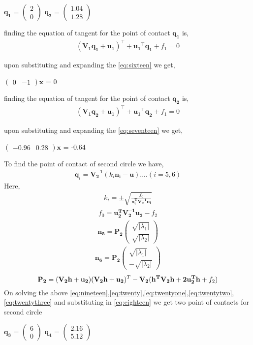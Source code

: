\documentclass[journal,12pt,twocolumn]{IEEEtran}
\newcommand{\myvec}[1]{\ensuremath{\begin{pmatrix}#1\end{pmatrix}}}
\let\vec\mathbf
\begin{document}
\begin{center}
$\vec{q_1}$ = $\myvec{2 \\ 0}$
$\vec{q_2}$ = $\myvec{1.04 \\ 1.28}$ 
\end{center}

finding the equation of tangent for the point of contact $\vec{q_1}$ is,
\begin{align}
\label{eq:sixteen}
(\vec{V_1}\vec{q_1}+\vec{u_1})^{\top}+\vec{u_1}^{\top}\vec{q_1} + f_1 = 0
\end{align} 

upon substituting and expanding the \eqref{eq:sixteen} we get,
\begin{center}
$\myvec{0 & -1}\vec{x}$ = 0 
\end{center}

finding the equation of tangent for the point of contact $\vec{q_2}$ is,
\begin{align}
\label{eq:seventeen}
(\vec{V_1}\vec{q_2}+\vec{u_1})^{\top}+\vec{u_1}^{\top}\vec{q_2} + f_1 = 0 
\end{align}

upon substituting and expanding the \eqref{eq:seventeen} we get,
\begin{center}
$\myvec{-0.96 & 0.28}\vec{x}$ = -0.64
\end{center}

To find the point of contact of second circle we have, 
\begin{align}
\label{eq:eighteen}
\boxed{\vec{q}_i = \vec{V_2^{-1}}(k_i\vec{n_i-u})}....(i = 5,6) 
\end{align}
Here, 
\begin{align}
\label{eq:nineteen}
k_i = \pm\sqrt{\frac{f_0}{\vec{n_i^TV_2^{-1}n_i}}}
\end{align}
\begin{align}
\label{eq:twenty}
f_0 = \vec{u_2^TV_2^{-1}u_2}-f_2
\end{align}
\begin{align}
\label{eq:twentyone}
\vec{n_5} = \vec{P_2}\myvec{\sqrt{|\lambda_1|} \\ \sqrt{|\lambda_2|}}
\end{align}
\begin{align}
\label{eq:twentytwo}
\vec{n_6} = \vec{P_2}\myvec{\sqrt{|\lambda_1|} \\ -\sqrt{|\lambda_2|}}
\end{align}
\begin{equation}
\label{eq:twentythree}
\small\vec{P_2} = (\vec{V_2h+u_2})(\vec{V_2h+u_2})^T-\vec{V_2(h^TV_2h+2u_2^Th}+f_2)
\end{equation}
On solving the above \eqref{eq:nineteen},\eqref{eq:twenty},\eqref{eq:twentyone},\eqref{eq:twentytwo},\eqref{eq:twentythree} and substituting in \eqref{eq:eighteen} we get two point of contacts for second circle 
\begin{center}
$\vec{q_3}$ = $\myvec{6 \\ 0}$
$\vec{q_4}$ = $\myvec{2.16 \\ 5.12}$ 
\end{center}
\end{document}
